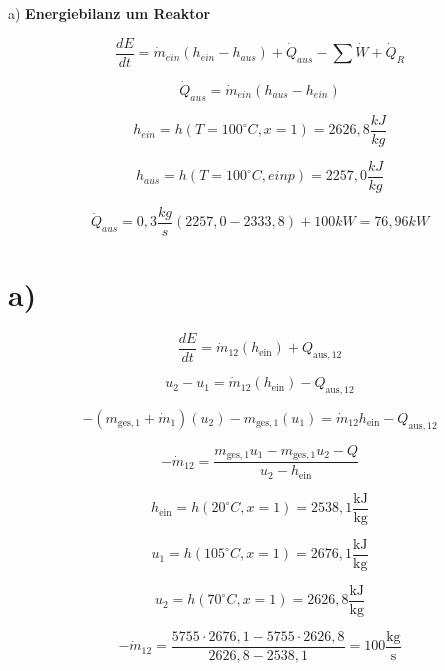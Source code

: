 a) \textbf{Energiebilanz um Reaktor}

\[
\frac{dE}{dt} = \dot{m}_{ein}(h_{ein} - h_{aus}) + \dot{Q}_{aus} - \sum \dot{W} + \dot{Q}_R
\]

\[
\dot{Q}_{aus} = \dot{m}_{ein}(h_{aus} - h_{ein})
\]

\[
h_{ein} = h(T=100^\circ C, x=1) = 2626,8 \frac{kJ}{kg}
\]

\[
h_{aus} = h(T=100^\circ C, einp) = 2257,0 \frac{kJ}{kg}
\]

\[
\dot{Q}_{aus} = 0,3 \frac{kg}{s} (2257,0 - 2333,8) + 100 kW = 76,96 kW
\]



\section*{a)}

\begin{equation*}
\frac{dE}{dt} = \dot{m}_{12} (h_{\text{ein}}) + Q_{\text{aus},12}
\end{equation*}

\begin{equation*}
u_2 - u_1 = \dot{m}_{12} (h_{\text{ein}}) - Q_{\text{aus},12}
\end{equation*}

\begin{equation*}
-(m_{\text{ges},1} + \dot{m}_1) (u_2) - m_{\text{ges},1} (u_1) = \dot{m}_{12} h_{\text{ein}} - Q_{\text{aus},12}
\end{equation*}

\begin{equation*}
- \dot{m}_{12} = \frac{m_{\text{ges},1} u_1 - m_{\text{ges},1} u_2 - Q}{u_2 - h_{\text{ein}}}
\end{equation*}

\begin{equation*}
h_{\text{ein}} = h(20^\circ C, x=1) = 2538,1 \frac{\text{kJ}}{\text{kg}}
\end{equation*}

\begin{equation*}
u_1 = h(105^\circ C, x=1) = 2676,1 \frac{\text{kJ}}{\text{kg}}
\end{equation*}

\begin{equation*}
u_2 = h(70^\circ C, x=1) = 2626,8 \frac{\text{kJ}}{\text{kg}}
\end{equation*}

\begin{equation*}
- \dot{m}_{12} = \frac{5755 \cdot 2676,1 - 5755 \cdot 2626,8}{2626,8 - 2538,1} = 100 \frac{\text{kg}}{\text{s}}
\end{equation*}